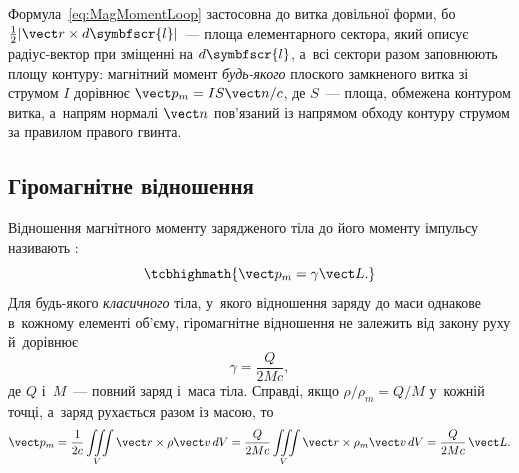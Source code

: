Формула~\eqref{eq:MagMomentLoop} застосовна до витка довільної форми, бо
$\tfrac12|\vect r\times d\symbfscr{l}|$~--- площа елементарного сектора, який описує
радіус-вектор при зміщенні на $d\symbfscr{l}$, а~всі сектори разом заповнюють площу
контуру: магнітний момент
\emph{будь-якого} плоского замкненого витка зі струмом $I$ дорівнює $\vect p_m = IS\vect n/c$,
де $S$~--- площа, обмежена контуром витка, а~напрям нормалі $\vect n$ пов'язаний із
напрямом обходу контуру струмом за правилом правого гвинта.


\subsection*{Гіромагнітне відношення}


Відношення магнітного моменту зарядженого тіла до його моменту імпульсу називають
:
\begin{equation*}
	\tcbhighmath{
		\vect p_m = \gamma\vect L.
	}
\end{equation*}
Для будь-якого \emph{класичного} тіла, у~якого відношення заряду до маси однакове
в~кожному елементі об'єму, гіромагнітне відношення не залежить від закону руху й~дорівнює
\begin{equation}\label{eq:GyromagneticClassical}
	\gamma = \frac{Q}{2Mc},
\end{equation}
де $Q$ і~$M$~--- повний заряд і~маса тіла. Справді, якщо $\rho/\rho_m = Q/M$ у~кожній
точці, а~заряд рухається разом із масою, то
\begin{equation*}
	\vect p_m = \frac1{2c}\iiint\limits_V \vect r\times\rho\vect v\, dV = \frac{Q}{2Mc}\iiint\limits_V \vect r\times\rho_m\vect v\, dV = \frac{Q}{2Mc}\,\vect L.
\end{equation*}

